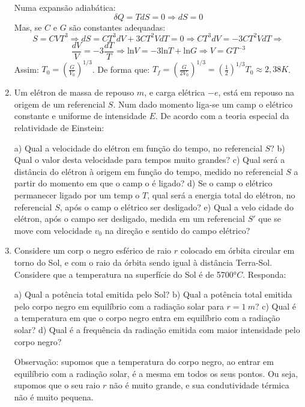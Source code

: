 \begin{enumerate}[start=1,label={\bfseries Q\arabic*.}]
\resposta Numa expansão adiabática:
$$
\delta Q = T dS = 0 \Rightarrow dS = 0
$$
Mas, se $C$ e $G$ são constantes adequadas:
$$
S = CVT^{3} \Rightarrow dS = CT^{3} dV + 3 C T^{2} V dT = 0 \Rightarrow CT^{3} dV = -3CT^{2}V dT \Rightarrow
$$
%
$$
\frac{dV}{V} = -3 \frac{dT}{T} \Rightarrow \mathrm{ln} V = -3 \mathrm{ln} T + \mathrm{ln} G \Rightarrow V = GT^{-3}
$$
Assim: $T_{0} = \left( \frac{G}{V_{0}} \right)^{1/3}$. De forma que: $T_{f} = \left( \frac{G}{2V_{0}} \right)^{1/3} = \left( \frac{1}{2} \right)^{1/3} T_{0} \approx 2,38 K$.








\item Um elétron de massa de repouso $m$, e carga elétrica $-e$, está em repouso na origem de um referencial $S$. Num dado momento liga-se um camp o elétrico constante e uniforme de intensidade $E$. De acordo com a teoria especial da relatividade de Einstein:

a) Qual a velocidade do elétron em função do tempo, no referencial $S$?
b) Qual o valor desta velocidade para tempos muito grandes?
c) Qual será a distância do elétron à origem em função do tempo, medido no referencial $S$ a partir do momento em que o camp o é ligado?
d) Se o camp o elétrico permanecer ligado por um temp o $T$, qual será a energia total do elétron, no referencial $S$, após o camp o elétrico ser desligado?
e) Qual a velo cidade do elétron, após o campo ser desligado, medida em um referencial $S'$ que se move com velocidade $v_{0}$ na direção e sentido do campo elétrico?




\item Considere um corp o negro esférico de raio $r$ colocado em órbita circular em torno do Sol, e com o raio da órbita sendo igual à distância Terra-Sol. Considere que a temperatura na superfície do Sol é de 5700°$C$. Responda:

a) Qual a potência total emitida pelo Sol?
b) Qual a potência total emitida pelo corpo negro em equilíbrio com a radiação solar para $r = 1\ m$?
c) Qual é a temperatura em que o corpo negro entra em equilíbrio com a radiação solar?
d) Qual é a frequência da radiação emitida com maior intensidade pelo corpo negro?

Observação: supomos que a temperatura do corpo negro, ao entrar em equilíbrio com a radiação solar, é a mesma em todos os seus pontos. Ou seja, supomos que o seu raio $r$ não é muito grande, e sua condutividade térmica não é muito pequena.




\end{enumerate}


























